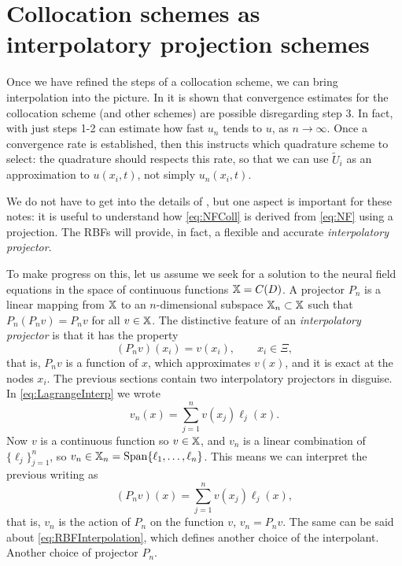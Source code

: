 \documentclass[a4paper]{siamart190516}
\begin{document}
\section{Collocation schemes as interpolatory projection schemes}\label{sec:projectionSchemes} 

Once we have refined the steps of a collocation scheme, we can bring interpolation
into the picture. In \cite{avitabileProjectionMethodsNeural2023} it is shown that convergence estimates
for the collocation scheme (and other schemes) are possible disregarding step 3. In
fact, with just steps 1-2 can estimate how fast $u_n$ tends to $u$, as $n \to \infty$.
Once a convergence rate is established, then this instructs which quadrature scheme
to select: the quadrature should respects this rate, so that we can use $\tilde U_i$ as an
approximation to $u(x_i,t)$, not simply $u_n(x_i,t)$. 

We do not have to get into the details of
\cite{avitabileProjectionMethodsNeural2023}, but one aspect is important for these
notes: it is useful to understand how \cref{eq:NFColl} is derived from \cref{eq:NF}
using a projection. The RBFs will provide, in fact, a flexible and accurate
\textit{interpolatory projector}. 

To make progress on this, let us assume we seek for a solution to the neural field
equations in the space of continuous functions $\mathbb{X} = C(D)$. A projector $P_n$ is a
linear mapping from $\mathbb{X}$ to an $n$-dimensional subspace $\mathbb{X}_n \subset \mathbb{X}$
such that $P_n (P_n v) = P_n v$ for all $v \in \mathbb{X}$. The distinctive feature of an
\textit{interpolatory projector} is that it has the property  
\[
  (P_n v)(x_i) = v(x_i), \qquad x_i \in \Xi,
\] 
that is, $P_n v$ is a function of $x$, which approximates $v(x)$, and it is exact
at the nodes $x_i$. The previous sections contain two interpolatory projectors in
disguise. In \cref{eq:LagrangeInterp} we wrote
\[
  v_n(x) = \sum_{j=1}^{n} v(x_j) \ell_j(x). 
\]
Now $v$ is a continuous function so $v \in \mathbb{X}$, and $v_n$ is a linear combination
of $\{ \ell_j \}_{j=1}^n$, so $v_n \in \mathbb{X}_n = \operatorname{Span} \{ \ell_1, \ldots, \ell_n \}$.
This means we can interpret the previous writing as
\[
  (P_n v)(x) = \sum_{j=1}^{n} v(x_j) \ell_j(x),
\]
that is, $v_n$ is the action of $P_n$ on the function $v$, $v_n = P_n v$.
The same can be said about \cref{eq:RBFInterpolation}, which defines another choice
of the interpolant. Another choice of projector $P_n$.
\end{document}
